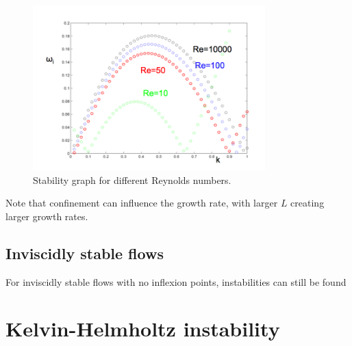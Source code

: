 \documentclass[palatino]{epflnotes}
\begin{document}
\begin{figure}[hbtp]
\centering
\includegraphics[width = 0.8\textwidth]{img/ReViscousKH.png}
\caption{Stability graph for different Reynolds numbers.}
\label{fig:StabilityKH}
\end{figure}

Note that confinement can influence the growth rate, with larger $L$ creating larger growth rates.

\subsection{Inviscidly stable flows}

For inviscidly stable flows with no inflexion points, instabilities can still be found

\section{Kelvin-Helmholtz instability}
\end{document}
